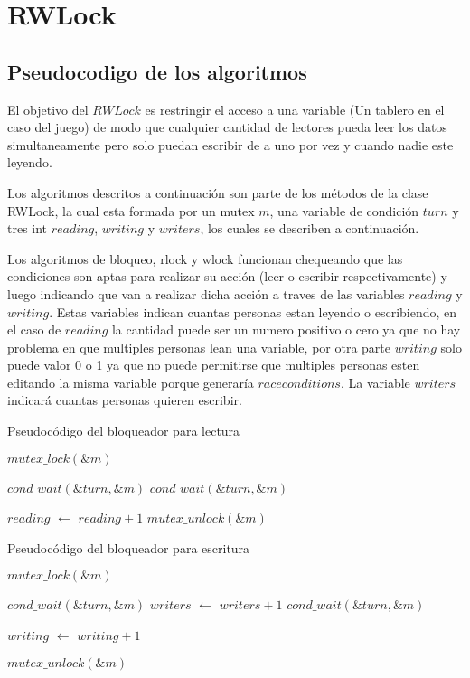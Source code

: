 \section{RWLock}

\subsection{Pseudocodigo de los algoritmos}

El objetivo del $RWLock$ es restringir el acceso a una variable (Un tablero en el caso del juego) de modo que cualquier cantidad de lectores pueda leer los datos simultaneamente pero solo puedan escribir de a uno por vez y cuando nadie este leyendo.

Los algoritmos descritos a continuación son parte de los métodos de la clase RWLock, la cual esta formada por un mutex $m$, una variable de condición $turn$ y tres int $reading$, $writing$ y $writers$, los cuales se describen a continuación.

Los algoritmos de bloqueo, rlock y wlock funcionan chequeando que las condiciones son aptas para realizar su acción (leer o escribir respectivamente) y luego indicando que van a realizar dicha acción a traves de las variables $reading$ y $writing$. Estas variables indican cuantas personas estan leyendo o escribiendo, en el caso de $reading$ la cantidad puede ser un numero positivo o cero ya que no hay problema en que multiples personas lean una variable, por otra parte $writing$ solo puede valor 0 o 1 ya que no puede permitirse que multiples personas esten editando la misma variable porque generaría $race conditions$. La variable $writers$ indicará cuantas personas quieren escribir.

\begin{algorithm}[H]
  \begin{algorithmic}[1]
  \caption{Pseudocódigo del bloqueador para lectura}
  \label{algo:3-1}
	\State $mutex\_lock(\&m)$

		\State $ cond\_wait(\&turn, \&m) $
	\EndWhile
		\State $ cond\_wait(\&turn, \&m) $
	\EndWhile
	
	\State $reading$ $\leftarrow$ $reading + 1$
	\State $mutex\_unlock(\&m)$

	\EndProcedure
	\end{algorithmic}
\end{algorithm}

\begin{algorithm}[H]
  \begin{algorithmic}[1]
  \caption{Pseudocódigo del bloqueador para escritura}
  \label{algo:3-1}
	\State $mutex\_lock(\&m)$

		\State $ cond\_wait(\&turn, \&m) $
	\EndWhile
	\State $writers$ $\leftarrow$ $writers + 1$
		\State $ cond\_wait(\&turn, \&m) $
	\EndWhile
	
	\State $writing$ $\leftarrow$ $writing + 1$

	\State $mutex\_unlock(\&m)$

	\EndProcedure
	\end{algorithmic}
\end{algorithm}

